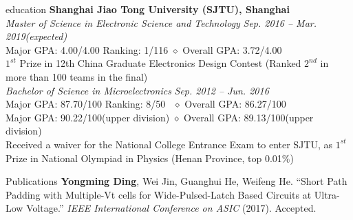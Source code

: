 \documentclass{resume_Stanford} %
\begin{document}

\begin{rSection}{education}
\textbf{Shanghai Jiao Tong University (SJTU), Shanghai}
\\\emph{Master of Science in Electronic Science and Technology} \hfill \emph{Sep. 2016 -- Mar. 2019(expected)}
\\\bm{$\diamond$} Major GPA: 4.00/4.00 \qquad Ranking: 1/116 \qquad $\diamond$ Overall GPA: 3.72/4.00
\\\bm{$\diamond$} $1^{st}$ Prize in 12th China Graduate Electronics Design Contest (Ranked $2^{nd}$ in more than 100 teams in the final)
\\\emph{Bachelor of Science in Microelectronics} \hfill \emph{Sep. 2012 -- Jun. 2016}
\\\bm{$\diamond$} Major GPA: 87.70/100 \qquad Ranking: 8/50 \qquad \ $\diamond$ Overall GPA: 86.27/100
\\\bm{$\diamond$} Major GPA: 90.22/100(upper division) \qquad \qquad$\diamond$ Overall GPA: 89.13/100(upper division)
\\\bm{$\diamond$} Received a waiver for the National College Entrance Exam to enter SJTU, as $1^{st}$ Prize in National Olympiad in Physics (Henan Province, top 0.01$\%$)
\end{rSection}

\begin{rSection}{Publications}
\textbf{Yongming Ding}, Wei Jin, Guanghui He, Weifeng He. ``Short Path Padding with Multiple-Vt cells for Wide-Pulsed-Latch Based Circuits at Ultra-Low Voltage.'' \emph{IEEE International Conference on ASIC}  (2017). Accepted.
\end{rSection}
\end{document}

